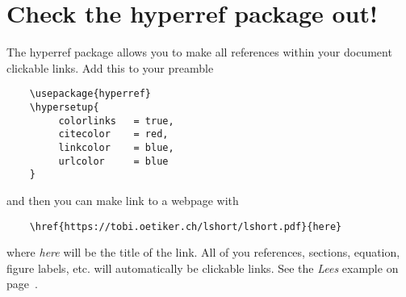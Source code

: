 \documentclass{article}
\begin{document}
\newpage

\section{Check the hyperref package out!}
\label{sec:hyper}

The hyperref package allows you to make all references within your document clickable links. Add this to your preamble

\begin{verbatim}
	\usepackage{hyperref}
	\hypersetup{
	     colorlinks   = true,
	     citecolor    = red,
	     linkcolor    = blue,
	     urlcolor     = blue
	}
\end{verbatim}
and then you can make link to a webpage with 
\begin{verbatim}
	\href{https://tobi.oetiker.ch/lshort/lshort.pdf}{here}
\end{verbatim}
where \textit{here} will be the title of the link. All of you references, sections, equation, figure labels, etc. will automatically be clickable links. See the \textit{Lees} example on page~\pageref{sec:firstSection}.
\newpage



\end{document}
